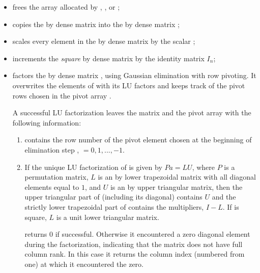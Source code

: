 \begin{itemize}
\item {}
  \par {} frees the array  allocated by ,
  , or ;

\item {}
  \par {} copies the  by  dense matrix  into the
   by  dense matrix ;

\item {}
  \par {} scales every element in the  by  dense
  matrix  by the scalar ;

\item {}
  \par {} increments the {\em square}  by  dense matrix 
   by the identity matrix $I_n$;

\item {}
  \par {} factors the  by  dense matrix ,
  using Gaussian elimination with row pivoting. 
  It overwrites the elements of  with its LU factors and keeps track of the
  pivot rows chosen in the pivot array .

  A successful LU factorization leaves the matrix  and the      
  pivot array  with the following information:                  
  \begin{enumerate}
  \item 
     contains the row number of the pivot element chosen   
    at the beginning of elimination step , 
     $ = 0, 1, ..., $$-1$.  

  \item 
    If the unique LU factorization of  is given by $Pa = LU$,   
    where $P$ is a permutation matrix, $L$ is an  by 
    lower trapezoidal matrix with all diagonal elements equal to $1$, 
    and $U$ is an  by  upper triangular matrix, 
    then the upper triangular part of  (including its diagonal) 
    contains $U$ and the strictly lower trapezoidal part of  
    contains the multipliers, $I-L$. 
    If  is square, $L$ is a unit lower triangular matrix.
                      
     returns 0 if successful. Otherwise it encountered a zero  
    diagonal element during the factorization, indicating that the matrix 
    does not have full column rank.
    In this case it returns the column index (numbered from one) at which it       
    encountered the zero.
    \end{enumerate}


\end{itemize}
